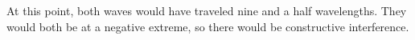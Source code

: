 At this point, both waves would have traveled nine and a half wavelengths. They would both be at a
negative extreme, so there would be constructive interference.



